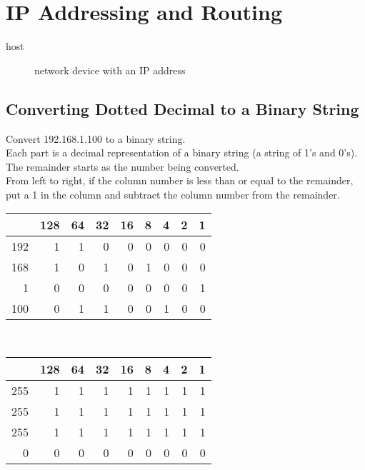 \section{IP Addressing and Routing}

\begin{description}

\item[host]
network device with an IP address

\end{description}

\subsection{Converting Dotted Decimal to a Binary String}

Convert 192.168.1.100 to a binary string.\\

Each part is a decimal representation of a binary string (a string of 1's and
0's).\\

The remainder starts as the number being converted.\\

From left to right, if the column number is less than or equal to the
remainder, put a 1 in the column and subtract the column number from the
remainder.\\

\begin{tabular}{ | r | r | r | r | r | r | r | r | r | }
\hline
    & 128 & 64 & 32 & 16 & 8 & 4 & 2 & 1 \\ \hline
192 &   1 &  1 &  0 &  0 & 0 & 0 & 0 & 0 \\ \hline
168 &   1 &  0 &  1 &  0 & 1 & 0 & 0 & 0 \\ \hline
  1 &   0 &  0 &  0 &  0 & 0 & 0 & 0 & 1 \\ \hline
100 &   0 &  1 &  1 &  0 & 0 & 1 & 0 & 0 \\ \hline
\end{tabular}\\

\begin{tabular}{ | r | r | r | r | r | r | r | r | r | }
\hline
    & 128 & 64 & 32 & 16 & 8 & 4 & 2 & 1 \\ \hline
255 &   1 &  1 &  1 &  1 & 1 & 1 & 1 & 1 \\ \hline
255 &   1 &  1 &  1 &  1 & 1 & 1 & 1 & 1 \\ \hline
255 &   1 &  1 &  1 &  1 & 1 & 1 & 1 & 1 \\ \hline
  0 &   0 &  0 &  0 &  0 & 0 & 0 & 0 & 0 \\ \hline
\end{tabular}

